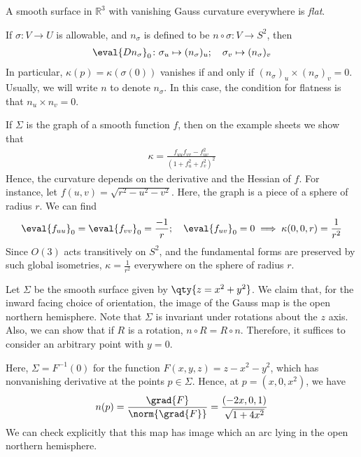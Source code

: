 \begin{definition}
	A smooth surface in $\mathbb R^3$ with vanishing Gauss curvature everywhere is \textit{flat}.
\end{definition}
\begin{remark}
	If $\sigma\colon V \to U$ is allowable, and $n_\sigma$ is defined to be $n \circ \sigma \colon V \to S^2$, then
	\begin{align*}
		\eval{Dn_\sigma}_0 \colon \sigma_u \mapsto (n_\sigma)_u;\quad \sigma_v \mapsto (n_\sigma)_v
	\end{align*}
	In particular, $\kappa(p) = \kappa(\sigma(0))$ vanishes if and only if $(n_\sigma)_u \times (n_\sigma)_v = 0$.
	Usually, we will write $n$ to denote $n_\sigma$.
	In this case, the condition for flatness is that $n_u \times n_v = 0$.
\end{remark}
\begin{example}
	If $\Sigma$ is the graph of a smooth function $f$, then on the example sheets we show that
	\begin{align*}
		\kappa = \frac{f_{uu} f_{vv} - f_{uv}^2}{(1+f_u^2 + f_v^2)^2}
	\end{align*}
	Hence, the curvature depends on the derivative and the Hessian of $f$.
	For instance, let $f(u,v) = \sqrt{r^2 - u^2 - v^2}$.
	Here, the graph is a piece of a sphere of radius $r$.
	We can find
	\begin{align*}
		\eval{f_{uu}}_0 = \eval{f_{vv}}_0 = \frac{-1}{r};\quad \eval{f_{uv}}_0 = 0 \implies \kappa(0,0,r) = \frac{1}{r^2}
	\end{align*}
	Since $O(3)$ acts transitively on $S^2$, and the fundamental forms are preserved by such global isometries, $\kappa = \frac{1}{r^2}$ everywhere on the sphere of radius $r$.
\end{example}
\begin{example}
	Let $\Sigma$ be the smooth surface given by $\qty{z = x^2 + y^2}$.
	We claim that, for the inward facing choice of orientation, the image of the Gauss map is the open northern hemisphere.
	Note that $\Sigma$ is invariant under rotations about the $z$ axis.
	Also, we can show that if $R$ is a rotation, $n \circ R = R \circ n$.
	Therefore, it suffices to consider an arbitrary point with $y = 0$.

	Here, $\Sigma = F^{-1}(0)$ for the function $F(x,y,z) = z - x^2 - y^2$, which has nonvanishing derivative at the points $p \in \Sigma$.
	Hence, at $p = (x,0,x^2)$, we have
	\begin{align*}
		n(p) = \frac{\grad{F}}{\norm{\grad{F}}} = \frac{(-2x,0,1)}{\sqrt{1+4x^2}}
	\end{align*}
	We can check explicitly that this map has image which an arc lying in the open northern hemisphere.
\end{example}

